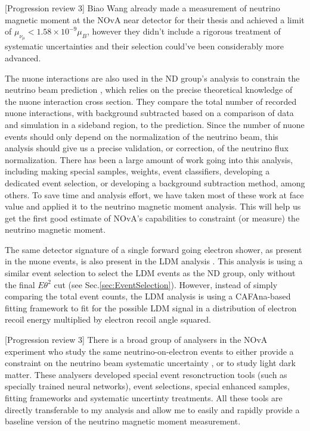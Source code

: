 [Progression review 3]  Biao Wang already made a measurement of neutrino magnetic moment at the NOvA near detector for their thesis \cite{nuMM-thesis-biaow.pdf} and achieved a limit of $\mu_{\nu_\mu}<1.58\times 10^{-9}\mu_B$, however they didn't include a rigorous treatment of systematic uncertainties and their selection could've been considerably more advanced.


The \gls{nuone} interactions are also used in the \gls{ND} group's analysis to constrain the neutrino beam prediction \cite{NOVA-doc-56383}, which relies on the precise theoretical knowledge of the \gls{nuone} interaction cross section. They compare the total number of recorded \gls{nuone} interactions, with background subtracted based on a comparison of data and simulation in a sideband region, to the prediction. Since the number of \gls{nuone} events should only depend on the normalization of the neutrino beam, this analysis should give us a precise validation, or correction, of the neutrino flux normalization. There has been a large amount of work going into this analysis, including making special samples, weights, event classifiers, developing a dedicated event selection, or developing a background subtraction method, among others. To save time and analysis effort, we have taken most of these work at face value and applied it to the neutrino magnetic moment analysis. This will help us get the first good estimate of \gls{NOvA}'s capabilities to constraint (or measure) the neutrino magnetic moment.

The same detector signature of a single forward going electron shower, as present in the \gls{nuone} events, is also present in the \gls{LDM} analysis \cite{NOVA-doc-59439}. This analysis is using a similar event selection to select the \gls{LDM} events as the \gls{ND} group, only without the final $E\theta^2$ cut (see Sec.\ref{sec:EventSelection}). However, instead of simply comparing the total event counts, the \gls{LDM} analysis is using a CAFAna-based fitting framework to fit for the possible \gls{LDM} signal in a distribution of electron recoil energy multiplied by electron recoil angle squared.

[Progression review 3] There is a broad group of analysers in the NOvA experiment who study the same neutrino-on-electron events to either provide a constraint on the neutrino beam systematic uncertainty \cite{Nuone_Neutrino2022Poster}, or to study light dark matter. These analysers developed special event resonctruction tools (such as specially trained neural networks), event selections, special enhanced samples, fitting frameworks and systematic uncertinty treatments. All these tools are directly transferable to my analysis and allow me to easily and rapidly provide a baseline version of the neutrino magnetic moment measurement.


